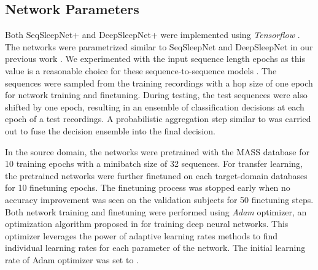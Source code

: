 \documentclass[journal,twoside,web]{ieeecolor}
\begin{document}
\vspace{-0.25cm}
\subsection{Network Parameters}
Both SeqSleepNet+ and DeepSleepNet+ were implemented using \emph{Tensorflow} \cite{Abadi2016}. The networks were parametrized similar to SeqSleepNet and DeepSleepNet in our previous work \cite{Phan2019a}. We experimented with the input sequence length  epochs as this value is a reasonable choice for these sequence-to-sequence models \cite{Phan2019a}. The sequences were sampled from the training recordings with a hop size of one epoch for network training and finetuning. During testing, the test sequences were also shifted by one epoch, resulting in an ensemble of  classification decisions at each epoch of a test recordings. A probabilistic aggregation step similar to \cite{Phan2019a} was carried out to fuse the decision ensemble into the final decision.

In the source domain, the networks were pretrained with the MASS database for 10 training epochs with a minibatch size of 32 sequences. For transfer learning, the pretrained networks were further finetuned on each target-domain databases for 10 finetuning epochs. The finetuning process was stopped early when no accuracy improvement was seen on the validation subjects for 50 finetuning steps. Both network training and finetuning were performed using \emph{Adam} optimizer, an optimization algorithm proposed in \cite{Kingma2015} for training deep neural networks. This optimizer leverages the power of adaptive learning rates methods to find individual learning rates for each parameter of the network. The initial learning rate of Adam optimizer was set to .
\end{document}
